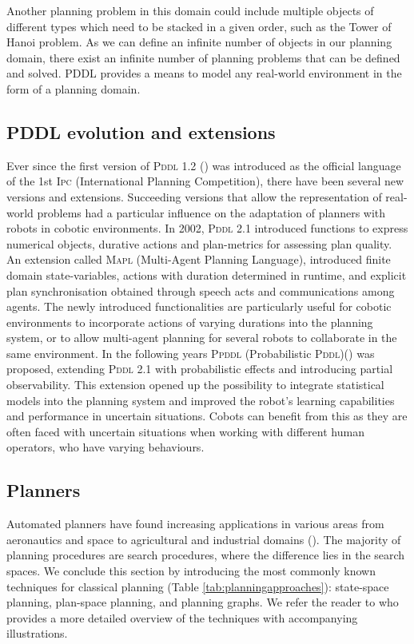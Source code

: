 Another planning problem in this domain could include multiple objects of different types which need to be stacked in a given order, such as the Tower of Hanoi problem.
As we can define an infinite number of objects in our planning domain, there exist an infinite number of planning problems that can be defined and solved. 
PDDL provides a means to model any real-world environment in the form of a planning domain. 


\subsection{PDDL evolution and extensions}\label{subsec:PDDL evolution}

Ever since the first version of \textsc{Pddl} 1.2 (\cite{mcdermott1998pddl}) was introduced as the official language of the 1st \textsc{Ipc} (International Planning Competition), there have been several new versions and extensions.
Succeeding versions that allow the representation of real-world problems had a particular influence on the adaptation of planners with robots in cobotic environments. 
In 2002, \textsc{Pddl} 2.1 introduced functions to express numerical objects, durative actions and plan-metrics for assessing plan quality.
An extension called \textsc{Mapl} (Multi-Agent Planning Language), introduced finite domain state-variables, actions with duration determined in runtime, and explicit plan synchronisation obtained through speech acts and communications among agents. 
The newly introduced functionalities are particularly useful for cobotic environments to incorporate actions of varying durations into the planning system, or to allow multi-agent planning for several robots to collaborate in the same environment.
In the following years \textsc{Ppddl} (Probabilistic \textsc{Pddl})(\cite{younes:04a}) was proposed, extending \textsc{Pddl} 2.1 with probabilistic effects and introducing partial observability. 
This extension opened up the possibility to integrate statistical models into the planning system and improved the robot's learning capabilities and performance in uncertain situations. 
Cobots can benefit from this as they are often faced with uncertain situations when working with different human operators, who have varying behaviours.

\subsection{Planners}\label{subsec:Planners}
Automated planners have found increasing applications in various areas from aeronautics and space to agricultural and industrial domains (\cite{aarup1992optimum}). 
The majority of planning procedures are search procedures, where the difference lies in the search spaces.
We conclude this section by introducing the most commonly known techniques for classical planning (Table \ref{tab:planningapproaches}):
state-space planning, plan-space planning, and planning graphs. 
We refer the reader to \cite{nau2007current} who provides a more detailed overview of the techniques with accompanying illustrations.

